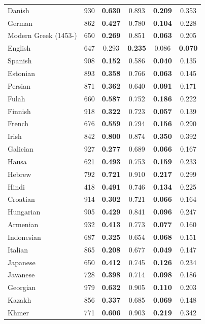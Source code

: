 \begin{longtable}{lp{0.8cm}cccc}
Danish & 930 & \textbf{0.630} & 0.893 & \textbf{0.209} & 0.353 \\
German & 862 & \textbf{0.427} & 0.780 & \textbf{0.104} & 0.228 \\
Modern Greek (1453-) & 650 & \textbf{0.269} & 0.851 & \textbf{0.063} & 0.205 \\
English & 647 & 0.293 & \textbf{0.235} & 0.086 & \textbf{0.070} \\
Spanish & 908 & \textbf{0.152} & 0.586 & \textbf{0.040} & 0.135 \\
Estonian & 893 & \textbf{0.358} & 0.766 & \textbf{0.063} & 0.145 \\
Persian & 871 & \textbf{0.362} & 0.640 & \textbf{0.091} & 0.171 \\
Fulah & 660 & \textbf{0.587} & 0.752 & \textbf{0.186} & 0.222 \\
Finnish & 918 & \textbf{0.322} & 0.723 & \textbf{0.057} & 0.139 \\
French & 676 & \textbf{0.559} & 0.794 & \textbf{0.156} & 0.290 \\
Irish & 842 & \textbf{0.800} & 0.874 & \textbf{0.350} & 0.392 \\
Galician & 927 & \textbf{0.277} & 0.689 & \textbf{0.066} & 0.167 \\
Hausa & 621 & \textbf{0.493} & 0.753 & \textbf{0.159} & 0.233 \\
Hebrew & 792 & \textbf{0.721} & 0.910 & \textbf{0.217} & 0.299 \\
Hindi & 418 & \textbf{0.491} & 0.746 & \textbf{0.134} & 0.225 \\
Croatian & 914 & \textbf{0.302} & 0.721 & \textbf{0.066} & 0.164 \\
Hungarian & 905 & \textbf{0.429} & 0.841 & \textbf{0.096} & 0.247 \\
Armenian & 932 & \textbf{0.413} & 0.773 & \textbf{0.077} & 0.160 \\
Indonesian & 687 & \textbf{0.325} & 0.654 & \textbf{0.068} & 0.151 \\
Italian & 865 & \textbf{0.208} & 0.677 & \textbf{0.049} & 0.147 \\
Japanese & 650 & \textbf{0.412} & 0.745 & \textbf{0.126} & 0.234 \\
Javanese & 728 & \textbf{0.398} & 0.714 & \textbf{0.098} & 0.186 \\
Georgian & 979 & \textbf{0.632} & 0.905 & \textbf{0.110} & 0.203 \\
Kazakh & 856 & \textbf{0.337} & 0.685 & \textbf{0.069} & 0.148 \\
Khmer & 771 & \textbf{0.606} & 0.903 & \textbf{0.219} & 0.342 \\

\end{longtable}
